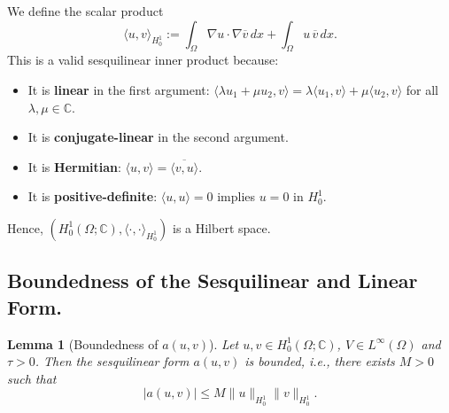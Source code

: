 \documentclass{article}
\theoremstyle{definition}
\theoremstyle{plain}
\newtheorem{lemma}[definition]{Lemma}
\theoremstyle{remark}
\begin{document}
We define the scalar product
\[
\langle u, v \rangle_{H_0^1} := \int_\Omega \nabla u \cdot \nabla \overline{v} \, dx + \int_\Omega u \, \overline{v} \, dx.
\]
This is a valid sesquilinear inner product because:
\begin{itemize}
  \item It is \textbf{linear} in the first argument: $\langle \lambda u_1 + \mu u_2, v \rangle = \lambda \langle u_1, v \rangle + \mu \langle u_2, v \rangle$ for all $\lambda, \mu \in \mathbb{C}$.
  \item It is \textbf{conjugate-linear} in the second argument.
  \item It is \textbf{Hermitian}: $\langle u, v \rangle = \overline{\langle v, u \rangle}$.
  \item It is \textbf{positive-definite}: $\langle u, u \rangle = 0$ implies $u = 0$ in $H_0^1$.
\end{itemize}
Hence, $(H_0^1(\Omega; \mathbb{C}), \langle \cdot, \cdot \rangle_{H_0^1})$ is a Hilbert space.

\subsection*{Boundedness of the Sesquilinear and Linear Form.}

\begin{lemma}[Boundedness of $a(u, v)$]
Let $u, v \in H_0^1(\Omega; \mathbb{C})$, $V \in L^\infty(\Omega)$ and $\tau > 0$. Then the sesquilinear form $a(u, v)$ is bounded, i.e., there exists $M > 0$ such that
\[
|a(u, v)| \leq M \|u\|_{H_0^1} \|v\|_{H_0^1}.
\]
\end{lemma}
\end{document}
